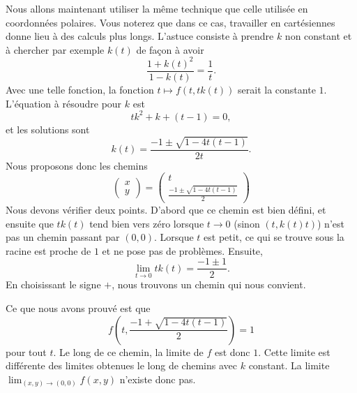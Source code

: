 \begin{example}
    Nous allons maintenant utiliser la même technique que celle utilisée en coordonnées polaires. Vous noterez que dans ce cas, travailler en cartésiennes donne lieu à des calculs plus longs.  L'astuce consiste à prendre \( k\) non constant et à chercher par exemple \( k(t)\) de façon à avoir
    \begin{equation}
        \frac{ 1+k(t)^2 }{ 1-k(t) }=\frac{1}{ t }.
    \end{equation}
    Avec une telle fonction, la fonction \( t\mapsto f(t,tk(t))\) serait la constante \( 1\). L'équation à résoudre pour \( k\) est
    \begin{equation}
        tk^2+k+(t-1)=0,
    \end{equation}
    et les solutions sont
    \begin{equation}
        k(t)=\frac{ -1\pm\sqrt{1-4t(t-1)} }{ 2t }.
    \end{equation}
    Nous proposons donc les chemins
    \begin{equation}
        \begin{pmatrix}
            x    \\ 
            y    
        \end{pmatrix}=\begin{pmatrix}
            t    \\ 
            \frac{ -1\pm\sqrt{1-4t(t-1)}    }{2}
        \end{pmatrix}
    \end{equation}
    Nous devons vérifier deux points. D'abord que ce chemin est bien défini, et ensuite que \( tk(t)\) tend bien vers zéro lorsque \( t\to 0\) (sinon \( (t,k(t)t)\)) n'est pas un chemin passant par \( (0,0)\). Lorsque \( t\) est petit, ce qui se trouve sous la racine est proche de \( 1\) et ne pose pas de problèmes. Ensuite,
    \begin{equation}
        \lim_{t\to 0} tk(t)=\frac{ -1\pm 1 }{ 2 }.
    \end{equation}
    En choisissant le signe \( +\), nous trouvons un chemin qui nous convient. 

    Ce que nous avons prouvé est que
    \begin{equation}
        f\left( t,   \frac{ -1+\sqrt{1-4t(t-1)}    }{2}\right)=1
    \end{equation}
    pour tout \( t\). Le long de ce chemin, la limite de \( f\) est donc \( 1\). Cette limite est différente des limites obtenues le long de chemins avec \( k\) constant. La limite \( \lim_{(x,y)\to (0,0)} f(x,y)\) n'existe donc pas.
\end{example}


